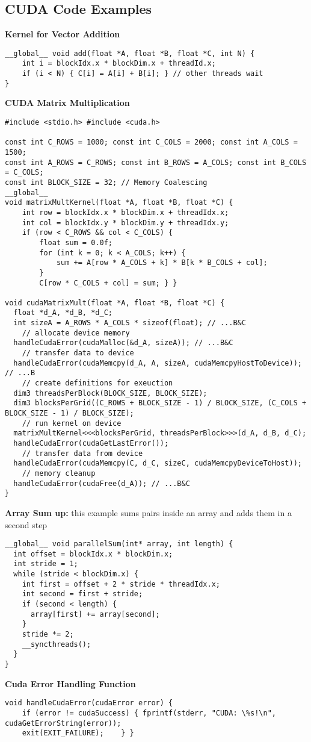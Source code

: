 \subsection{CUDA Code Examples}
\textbf{Kernel for Vector Addition}
\begin{lstlisting}[style=csharp]
__global__ void add(float *A, float *B, float *C, int N) {
	int i = blockIdx.x * blockDim.x + threadId.x;
	if (i < N) { C[i] = A[i] + B[i]; } // other threads wait
}
\end{lstlisting}  

\textbf{CUDA Matrix Multiplication}
\begin{lstlisting}[style=csharp]
#include <stdio.h> #include <cuda.h>

const int C_ROWS = 1000; const int C_COLS = 2000; const int A_COLS = 1500;
const int A_ROWS = C_ROWS; const int B_ROWS = A_COLS; const int B_COLS = C_COLS;
const int BLOCK_SIZE = 32; // Memory Coalescing
__global__
void matrixMultKernel(float *A, float *B, float *C) {
	int row = blockIdx.x * blockDim.x + threadIdx.x;
	int col = blockIdx.y * blockDim.y + threadIdx.y;
	if (row < C_ROWS && col < C_COLS) {
		float sum = 0.0f;
		for (int k = 0; k < A_COLS; k++) {
			sum += A[row * A_COLS + k] * B[k * B_COLS + col];
		}
		C[row * C_COLS + col] = sum; } }

void cudaMatrixMult(float *A, float *B, float *C) {
  float *d_A, *d_B, *d_C;
  int sizeA = A_ROWS * A_COLS * sizeof(float); // ...B&C
    // allocate device memory
  handleCudaError(cudaMalloc(&d_A, sizeA)); // ...B&C
    // transfer data to device
  handleCudaError(cudaMemcpy(d_A, A, sizeA, cudaMemcpyHostToDevice)); // ...B
    // create definitions for exeuction
  dim3 threadsPerBlock(BLOCK_SIZE, BLOCK_SIZE);
  dim3 blocksPerGrid((C_ROWS + BLOCK_SIZE - 1) / BLOCK_SIZE, (C_COLS + BLOCK_SIZE - 1) / BLOCK_SIZE);
    // run kernel on device
  matrixMultKernel<<<blocksPerGrid, threadsPerBlock>>>(d_A, d_B, d_C);
  handleCudaError(cudaGetLastError());
    // transfer data from device
  handleCudaError(cudaMemcpy(C, d_C, sizeC, cudaMemcpyDeviceToHost));
    // memory cleanup
  handleCudaError(cudaFree(d_A)); // ...B&C
}
\end{lstlisting}

\textbf{Array Sum up:} this example sums pairs inside an array and adds them in a second step
\begin{lstlisting}[style=csharp]
__global__ void parallelSum(int* array, int length) {
  int offset = blockIdx.x * blockDim.x;
  int stride = 1;
  while (stride < blockDim.x) {
    int first = offset + 2 * stride * threadIdx.x; 
    int second = first + stride;
    if (second < length) {
      array[first] += array[second];
    }
    stride *= 2;      
    __syncthreads();
  }
}
\end{lstlisting}
\textbf{Cuda Error Handling Function}
\begin{lstlisting}[style=csharp]
  void handleCudaError(cudaError error) { 
    if (error != cudaSuccess) { fprintf(stderr, "CUDA: \%s!\n", cudaGetErrorString(error));
    exit(EXIT_FAILURE);    } }
\end{lstlisting}

